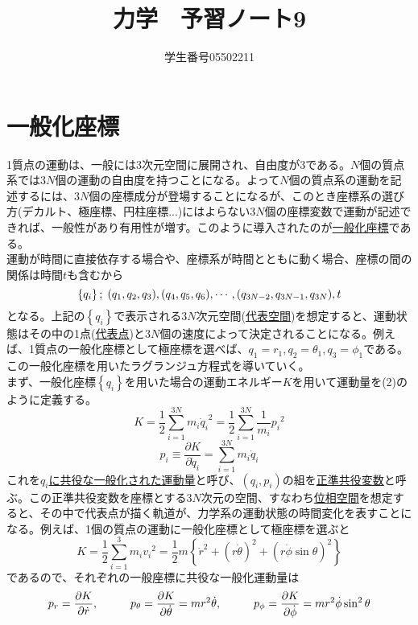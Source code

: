 \documentclass{jsarticle}
\title{力学　予習ノート9}
\author{学生番号05502211}
\date{}
\begin{document}
\maketitle
\section{一般化座標}
\noindent
1質点の運動は、一般には3次元空間に展開され、自由度が3である。\(N\)個の質点系では\(3N\)個の運動の自由度を持つことになる。よって\(N\)個の質点系の運動を記述するには、\(3N\)個の座標成分が登場することになるが、このとき座標系の選び方(デカルト、極座標、円柱座標...)にはよらない\(3N\)個の座標変数で運動が記述できれば、一般性があり有用性が増す。このように導入されたのが\underline{一般化座標}である。\\
運動が時間に直接依存する場合や、座標系が時間とともに動く場合、座標の間の関係は時間\(t\)も含むから
\begin{equation}
\left\{q_{i}\right\};\hspace{1mm}(q_{1},q_{2},q_{3}),(q_{4},q_{5},q_{6}),\cdots,(q_{3N-2},q_{3N-1},q_{3N}),t
\end{equation}
となる。上記の\(\left\{q_{i}\right\}\)で表示される\(3N\)次元空間(\underline{代表空間})を想定すると、運動状態はその中の1点(\underline{代表点})と\(3N\)個の速度によって決定されることになる。例えば、1質点の一般化座標として極座標を選べば、\(q_{1}=r_{1},q_{2}=\theta_{1},q_{3}=\phi_{1}\)である。\\
この一般化座標を用いたラグランジュ方程式を導いていく。\\
まず、一般化座標\(\left\{q_{i}\right\}\)を用いた場合の運動エネルギー\(K\)を用いて運動量を(2)のように定義する。\\
\[
K=\frac{1}{2}\sum_{i=1}^{3N}m_{i}{\dot{q}_{i}}^{2}=\frac{1}{2}\sum_{i=1}^{3N}\frac{1}{m_{i}}{p_{i}}^{2}
\]
\begin{equation}
p_{i}\equiv\frac{\partial K}{\partial\dot{q}_{i}}=\sum_{i=1}^{3N}m_{i}\dot{q}_{i}
\end{equation}
これを\underline{\(q_{i}\)に共役な一般化された運動量}と呼び、\((q_{i},p_{i})\)の組を\underline{正準共役変数}と呼ぶ。この正準共役変数を座標とする\(3N\)次元の空間、すなわち\underline{位相空間}を想定すると、その中で代表点が描く軌道が、力学系の運動状態の時間変化を表すことになる。例えば、1個の質点の運動に一般化座標として極座標を選ぶと
\[K=\frac{1}{2}\sum_{i=1}^{3}m_{i}{v_{i}}^{2}=\frac{1}{2}m\left\{{\dot{r}}^{2}+(r\dot{\theta})^{2}+(r\dot{\phi}\sin\theta)^{2}\right\}\]
であるので、それぞれの一般座標に共役な一般化運動量は
\[p_{r}=\frac{\partial K}{\partial\dot{r}},\hspace{10mm}p_{\theta}=\frac{\partial K}{\partial\dot{\theta}}=mr^{2}\dot{\theta},\hspace{10mm}p_{\phi}=\frac{\partial K}{\partial\dot{\phi}}=mr^{2}\dot{\phi}\sin^{2}\theta\]
\end{document}
